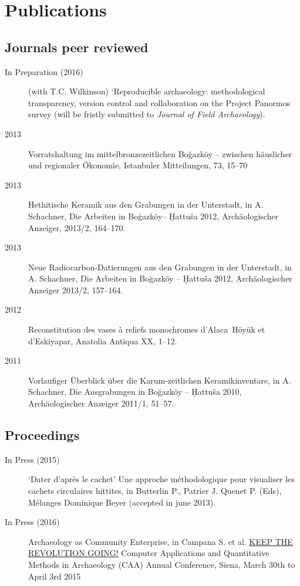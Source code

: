 \section{Publications}

\subsection*{Journals peer reviewed}

\begin{description}

  \item[In Preparation (2016)] (with T.C. Wilkinson) ‘Reproducible archaeology:
  methodological transparency, version control and collaboration on the Project
  Panormos survey (will be fristly submitted to \textit{Journal of Field
  Archaeology}).

\item [2013] Vorratshaltung im mittelbronzezeitlichen Bo\u{g}azköy -- zwischen
  häuslicher und regionaler Ökonomie, Istanbuler Mitteilungen, 73, 15--70

\item [2013] Hethitische Keramik aus den Grabungen in der Unterstadt, in A.
  Schachner, Die Arbeiten in Bo\u{g}azköy-- Ḫattu\v{s}a 2012, Archäologischer
  Anzeiger, 2013/2, 164--170.

\item [2013] Neue Radiocarbon-Datierungen aus den Grabungen in der Unterstadt,
  in A. Schachner, Die Arbeiten in Bo\u{g}azköy -- Ḫattu\v{s}a 2012,
  Archäologischer Anzeiger 2013/2, 157--164.

\item [2012] Reconstitution des vases à reliefs monochromes d’Alaca Höyük et
  d’Eskiyapar, Anatolia Antiqua XX, 1--12.

\item [2011] Vorlaufiger Überblick über die Karum-zeitlichen Keramikinventare,
  in A. Schachner, Die Ausgrabungen in Bo\u{g}azköy -- Ḫattu\-\v{s}a 2010,
  Archäologischer Anzeiger 2011/1, 51--57.


\end{description}

\subsection*{Proceedings}

\begin{description}

\item[In Press (2015)] ‘Dater d’après le cachet’ Une approche méthodologique
  pour visualiser les cachets circulaires hittites, in Butterlin P., Patrier J.
  Quenet P. (Eds), Mélanges Dominique Beyer (accepted in june 2013).

\item[In Press (2016)] Archaeology as Community Enterprise, in Campana S. et al.
  \href{http://caaconference.org/}{KEEP THE REVOLUTION GOING!} Computer
  Applications and Quantitative Methods in Archaeology (CAA) Annual Conference,
  Siena, March 30th to April 3rd 2015

\end{description}


